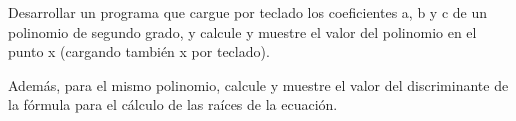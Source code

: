 Desarrollar un programa que cargue por teclado los coeficientes a, b y c de un polinomio de segundo grado, y calcule y muestre el valor del polinomio en el punto x (cargando también x por teclado). 

Además, para el mismo polinomio, calcule y muestre el valor del discriminante de la fórmula para el cálculo de las raíces de la ecuación.